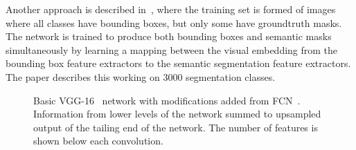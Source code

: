 Another approach is described in~\cite{hu2018learning}, where the
training set is formed of images where all classes have bounding
boxes, but only some have groundtruth masks. The network is trained to
produce both bounding boxes and semantic masks simultaneously by
learning a mapping between the visual embedding from the bounding box
feature extractors to the semantic segmentation feature
extractors. The paper describes this working on 3000 segmentation
classes.




\begin{figure}
  \centering
\caption[The VGG-16 network]{Basic VGG-16~\cite{simonyan2014vgg}
  network with modifications added from
  FCN~\cite{long2015fully}. Information from lower levels of the
  network summed to upsampled output of the tailing end of the
  network. The number of features is shown below each convolution.}
\label{fig:background:fcn}
\end{figure}











